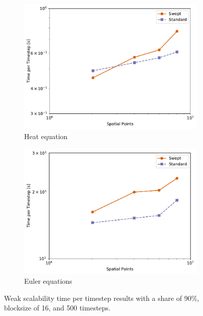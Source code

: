 \documentclass[mca,article,submit,moreauthors,pdftex]{Definitions/mdpi}
\begin{document}
\begin{figure}[htbp]
    \widefigure
    \begin{subfigure}[b]{0.45\textwidth}
        \includegraphics[scale=0.55]{figs/weakScalabilityHeat.pdf}
        \caption{Heat equation}
        \label{fig:scalabilityHeat}
    \end{subfigure}
    \begin{subfigure}[b]{0.5\textwidth}
        \widefigure
        \includegraphics[scale=0.55]{figs/weakScalabilityEuler.pdf}
        \caption{Euler equations}
        \label{fig:scalabilityEuler}
    \end{subfigure}
    \caption{Weak scalability time per timestep results with a share of 90\%, blocksize of 16, and 500 timesteps.}
    \label{fig:weak-scal}
\end{figure}
\end{document}
